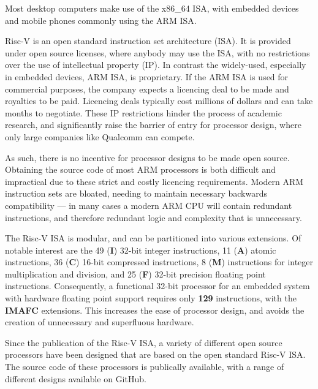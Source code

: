 \documentclass[a4paper,8pt]{report}
\begin{document}
Most desktop computers make use of the x86\_64 ISA, with embedded
devices and mobile phones commonly using the ARM ISA. 

Risc-V is an open standard instruction set architecture (ISA). It is provided
under open source licenses, where anybody may use the ISA, with no restrictions
over the use of intellectual property (IP). In contrast the widely-used,
especially in embedded devices, ARM ISA, is proprietary. If the ARM ISA is used
for commercial purposes, the company expects a licencing deal to be made and
royalties to be paid. Licencing deals typically cost millions of dollars and can
take months to negotiate. These IP restrictions hinder the process of academic
research, and significantly raise the barrier of entry for processor design,
where only large companies like Qualcomm can compete.

As such, there is no incentive for processor designs to be made open source.
Obtaining the source code of most ARM processors is both difficult and
impractical due to these strict and costly licencing requirements. Modern ARM
instruction sets are bloated, needing to maintain necessary backwards
compatibility --- in many cases a modern ARM CPU will contain redundant
instructions, and therefore redundant logic and complexity that is unnecessary.

The Risc-V ISA is modular, and can be partitioned into various extensions. Of
notable interest are the 49 (\textbf{I}) 32-bit integer instructions, 11
(\textbf{A}) atomic instructions, 36 (\textbf{C}) 16-bit compressed instructions, 8
(\textbf{M}) instructions for integer multiplication and division, and 25
(\textbf{F}) 32-bit precision floating point instructions. Consequently, a functional 32-bit
processor for an embedded system with hardware floating point support requires
only \textbf{129} instructions, with the \textbf{IMAFC} extensions. This
increases the ease of processor design, and avoids the creation of unnecessary
and superfluous hardware. 



Since the publication of the Risc-V ISA, a variety of different open source
processors have been designed that are based on the open standard Risc-V ISA.
The source code of these processors is publically available, with a range of
different designs available on GitHub.
\end{document}
